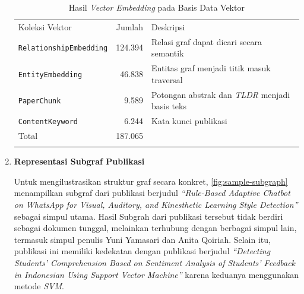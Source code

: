 \begin{enumerate}[label=(\alph*), leftmargin=*, itemsep=10pt]
          \begin{table}[htbp]
              \centering
              \small
              \caption{Hasil \textit{Vector Embedding} pada Basis Data Vektor}
              \label{tab:koleksi-vektor}
              \begin{tabular}{@{}P{0.35\textwidth}rP{0.35\textwidth}@{}}
                  Koleksi Vektor                 & Jumlah  & Deskripsi                                             \\
                  \texttt{RelationshipEmbedding} & 124.394 & Relasi graf dapat dicari secara semantik              \\
                  \texttt{EntityEmbedding}       & 46.838  & Entitas graf menjadi titik masuk traversal            \\
                  \texttt{PaperChunk}            & 9.589   & Potongan abstrak dan \textit{TLDR} menjadi basis teks \\
                  \texttt{ContentKeyword}        & 6.244   & Kata kunci publikasi                                  \\
                  Total                          & 187.065 &                                                       \\
              \end{tabular}
          \end{table}

    \item \textbf{Representasi Subgraf Publikasi}

          \hspace*{0.75cm} Untuk mengilustrasikan struktur graf secara konkret, \ref{fig:sample-subgraph} menampilkan subgraf dari publikasi berjudul
          \textit{``Rule-Based Adaptive Chatbot on WhatsApp for Visual, Auditory, and Kinesthetic Learning Style Detection''} sebagai simpul utama. Hasil Subgrah dari publikasi tersebut tidak berdiri sebagai dokumen tunggal, melainkan terhubung dengan berbagai simpul lain, termasuk simpul penulis Yuni Yamasari dan Anita Qoiriah. Selain itu, publikasi ini memiliki kedekatan dengan publikasi berjudul \textit{``Detecting Students' Comprehension Based on Sentiment Analysis of Students' Feedback in Indonesian Using Support Vector Machine''} karena keduanya menggunakan metode \textit{SVM}.


\end{enumerate}
